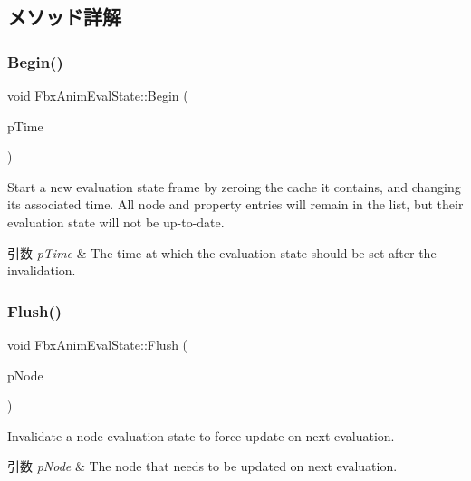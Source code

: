 \subsection{メソッド詳解}
\mbox{\label{class_fbx_anim_eval_state_aff48b77374c628e0e5e02d0dcb5aee55}} 
\subsubsection{\texorpdfstring{Begin()}{Begin()}}
{\footnotesize\ttfamily void Fbx\+Anim\+Eval\+State\+::\+Begin (\begin{DoxyParamCaption}\item[{const \hyperlink{class_fbx_time}{Fbx\+Time} \&}]{p\+Time }\end{DoxyParamCaption})}

Start a new evaluation state frame by zeroing the cache it contains, and changing its associated time. All node and property entries will remain in the list, but their evaluation state will not be up-\/to-\/date. 
\begin{DoxyParams}{引数}
{\em p\+Time} & The time at which the evaluation state should be set after the invalidation. \\
\hline
\end{DoxyParams}
\mbox{\label{class_fbx_anim_eval_state_a7e647a8391cf8f0356e38e0fd86f5310}} 
\subsubsection{\texorpdfstring{Flush()}{Flush()}\hspace{0.1cm}{\footnotesize\ttfamily [1/2]}}
{\footnotesize\ttfamily void Fbx\+Anim\+Eval\+State\+::\+Flush (\begin{DoxyParamCaption}\item[{\hyperlink{class_fbx_node}{Fbx\+Node} $\ast$}]{p\+Node }\end{DoxyParamCaption})}

Invalidate a node evaluation state to force update on next evaluation. 
\begin{DoxyParams}{引数}
{\em p\+Node} & The node that needs to be updated on next evaluation. \\
\hline
\end{DoxyParams}
\mbox{\label{class_fbx_anim_eval_state_aaeebbdfac04c6dbe42c992bc484698c3}} 
